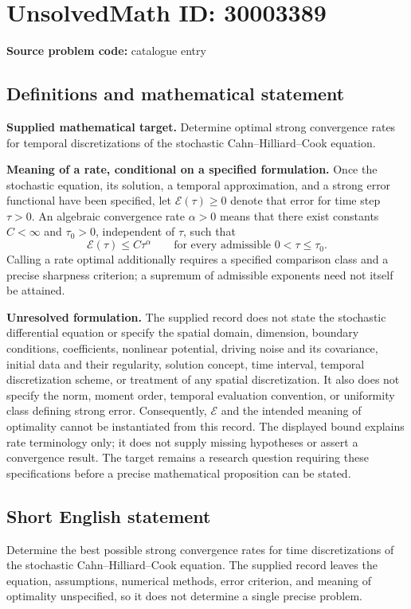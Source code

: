 \documentclass[11pt]{article}
\begin{document}
\section*{UnsolvedMath ID: 30003389}
\textbf{Source problem code:} catalogue entry
\subsection{Definitions and mathematical statement}
\textbf{Supplied mathematical target.} Determine optimal strong convergence rates for temporal discretizations of the stochastic Cahn--Hilliard--Cook equation.

\textbf{Meaning of a rate, conditional on a specified formulation.} Once the stochastic equation, its solution, a temporal approximation, and a strong error functional have been specified, let \(\mathcal E(\tau)\geq 0\) denote that error for time step \(\tau>0\). An algebraic convergence rate \(\alpha>0\) means that there exist constants \(C<\infty\) and \(\tau_0>0\), independent of \(\tau\), such that
\[
\mathcal E(\tau)\leq C\tau^\alpha
\qquad\text{for every admissible }0<\tau\leq\tau_0.
\]
Calling a rate optimal additionally requires a specified comparison class and a precise sharpness criterion; a supremum of admissible exponents need not itself be attained.

\textbf{Unresolved formulation.} The supplied record does not state the stochastic differential equation or specify the spatial domain, dimension, boundary conditions, coefficients, nonlinear potential, driving noise and its covariance, initial data and their regularity, solution concept, time interval, temporal discretization scheme, or treatment of any spatial discretization. It also does not specify the norm, moment order, temporal evaluation convention, or uniformity class defining strong error. Consequently, \(\mathcal E\) and the intended meaning of optimality cannot be instantiated from this record. The displayed bound explains rate terminology only; it does not supply missing hypotheses or assert a convergence result. The target remains a research question requiring these specifications before a precise mathematical proposition can be stated.
\subsection{Short English statement}
Determine the best possible strong convergence rates for time discretizations of the stochastic Cahn--Hilliard--Cook equation. The supplied record leaves the equation, assumptions, numerical methods, error criterion, and meaning of optimality unspecified, so it does not determine a single precise problem.
\end{document}
